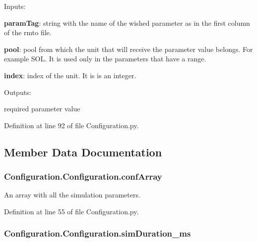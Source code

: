\begin{DoxyItemize}
\item Inputs\+:
\begin{DoxyItemize}
\item {\bfseries param\+Tag}\+: string with the name of the wished parameter as in the first column of the rmto file.
\item {\bfseries pool}\+: pool from which the unit that will receive the parameter value belongs. For example S\+OL. It is used only in the parameters that have a range.
\item {\bfseries index}\+: index of the unit. It is is an integer.
\end{DoxyItemize}
\item Outputs\+:
\begin{DoxyItemize}
\item required parameter value 
\end{DoxyItemize}
\end{DoxyItemize}

Definition at line 92 of file Configuration.\+py.



\subsection{Member Data Documentation}
\subsubsection[{\texorpdfstring{conf\+Array}{confArray}}]{\setlength{\rightskip}{0pt plus 5cm}Configuration.\+Configuration.\+conf\+Array}\hypertarget{class_configuration_1_1_configuration_a2b8c2d210ef82ba5088de3c8c9a8725d}{}\label{class_configuration_1_1_configuration_a2b8c2d210ef82ba5088de3c8c9a8725d}


An array with all the simulation parameters. 



Definition at line 55 of file Configuration.\+py.

\subsubsection[{\texorpdfstring{sim\+Duration\+\_\+ms}{simDuration_ms}}]{\setlength{\rightskip}{0pt plus 5cm}Configuration.\+Configuration.\+sim\+Duration\+\_\+ms}\hypertarget{class_configuration_1_1_configuration_aea238884fe3daa1287aa069f35d4ad3e}{}\label{class_configuration_1_1_configuration_aea238884fe3daa1287aa069f35d4ad3e}


